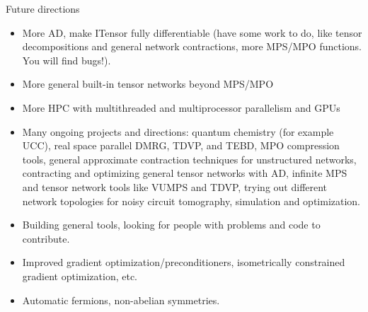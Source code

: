 \begin{frame}{Future directions}

\begin{itemize}[<+->]

  \item More AD, make ITensor fully differentiable (have some work to do, like tensor decompositions and general network contractions, more MPS/MPO functions. You will find bugs!).
  \item More general built-in tensor networks beyond MPS/MPO
  \item More HPC with multithreaded and multiprocessor parallelism and GPUs
  \item Many ongoing projects and directions: quantum chemistry (for example UCC), real space parallel DMRG, TDVP, and TEBD, MPO compression tools, general approximate contraction techniques for unstructured networks, contracting and optimizing general tensor networks with AD, infinite MPS and tensor network tools like VUMPS and TDVP, trying out different network topologies for noisy circuit tomography, simulation and optimization.
  \item Building general tools, looking for people with problems and code to contribute.
  \item Improved gradient optimization/preconditioners, isometrically constrained gradient optimization, etc.
  \item Automatic fermions, non-abelian symmetries.

\end{itemize}

\end{frame}
